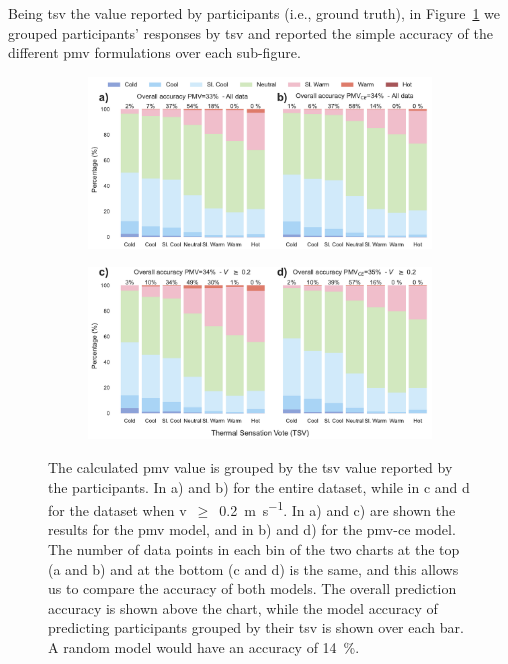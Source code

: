 Being \ac{tsv} the value reported by participants (i.e., ground truth), in Figure~\ref{fig:bar_stacked_model_accuracy} we grouped participants' responses by \ac{tsv} and reported the simple accuracy of the different \ac{pmv} formulations over each sub-figure.
\begin{figure}[htb!]
    \centering
    \begin{subfigure}[b]{\textwidth}
        \centering
        \includegraphics[width=\textwidth]{figures/bar_stacked_model_accuracy_0}
    \end{subfigure}
\par\bigskip %
    \begin{subfigure}[b]{\textwidth}
        \centering
        \includegraphics[width=\textwidth]{figures/bar_stacked_model_accuracy_0.2}
    \end{subfigure}
    \caption{The calculated \ac{pmv} value is grouped by the \ac{tsv} value reported by the participants. 
    In a) and b) for the entire dataset, while in c and d for the dataset when \ac{v}~$\geq$~\qty{0.2}{\m\per\s}. 
    In a) and c) are shown the results for the \ac{pmv} model, and in b) and d) for the \ac{pmv-ce} model. 
    The number of data points in each bin of the two charts at the top (a and b) and at the bottom (c and d) is the same, and this allows us to compare the accuracy of both models.
    The overall prediction accuracy is shown above the chart, while the model accuracy of predicting participants grouped by their \ac{tsv} is shown over each bar.
    A random model would have an accuracy of \qty{14}{\percent}.}
    \label{fig:bar_stacked_model_accuracy}
\end{figure}
